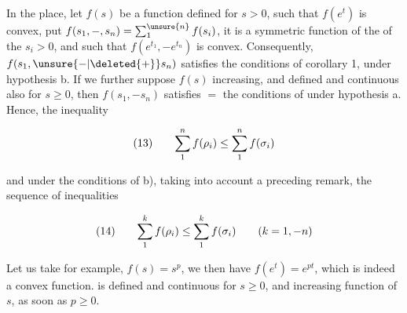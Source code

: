 
In the  place, let $f(s)$ be a function defined for $s>0$, such that $f(e^t)$ is convex, put $f(s_1,\mathord{-},s_n)=\sum_1^{\unsure{n}} f(s_i)$, it is a symmetric function of the  of the $s_i>0$, and such that $f(e^{t_1},\mathord{-}e^{t_n})$ is convex. Consequently,  $f(s_1,\unsure{\mathord{-}|\deleted{+}}s_n)$ satisfies the conditions of corollary 1, under hypothesis b. If we further suppose $f(s)$ increasing, and defined and continuous also for $s\geq0$, then $f(s_1,\mathord{-}s_n)$ satisfies $=$ the conditions of  under hypothesis a. Hence,    the inequality

\[
\begin{array}{@{}l@{\qquad}l@{}}
(13)&\displaystyle \sum_1^n f(\rho_i)\leq\sum_1^n f(\sigma_i)
\end{array}
\]

and under the conditions of b), taking into account a preceding remark, the sequence of inequalities

\[
\begin{array}{@{}l@{\qquad}l@{}}
(14)&\displaystyle \sum_1^k f(\rho_i)\leq\sum_1^k f(\sigma_i)\qquad(k=1,\mathord{-}n)
\end{array}
\]

Let us take for example,  $f(s)=s^p$,  we then have $f(e^t)=e^{pt}$, which is indeed a convex function.  is defined and  continuous for $s\geq0$, and  increasing function of $s$, as soon as $p\geq0$. 

{\reversemarginpar{}}
